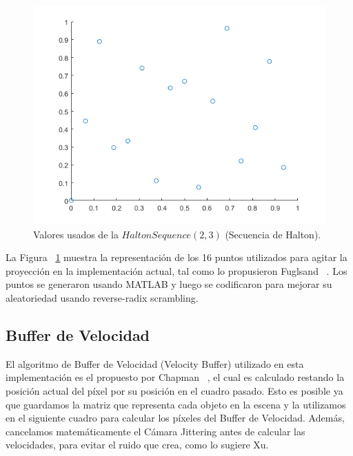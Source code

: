 \documentclass{cslthse-msc}
\begin{document}
\begin{figure}[!hbt]
	\centering
	\includegraphics[scale=0.5]{images/halton_16.png}
	\caption{Valores usados de la $Halton Sequence (2,3)$ (Secuencia de Halton).}\label{fig:halton16}
\end{figure}

La Figura ~\ref{fig:halton16} muestra la representación de los 16 puntos utilizados para agitar la proyección en la implementación actual, tal como lo propusieron Fuglsand ~\cite{Fuglsand2016}. Los puntos se generaron usando MATLAB y luego se codificaron para mejorar su aleatoriedad usando reverse-radix scrambling.

\subsection{Buffer de Velocidad}
El algoritmo de Buffer de Velocidad (Velocity Buffer) utilizado en esta implementación es el propuesto por Chapman ~\cite{Chapman2012}, el cual es calculado restando la posición actual del píxel por su posición en el cuadro pasado. Esto es posible ya que guardamos la matriz que representa cada objeto en la escena y la utilizamos en el siguiente cuadro para calcular los píxeles del Buffer de Velocidad. Además, cancelamos matemáticamente el Cámara Jittering antes de calcular las velocidades, para evitar el ruido que crea, como lo sugiere Xu. ~\cite{XU2016}
\end{document}

